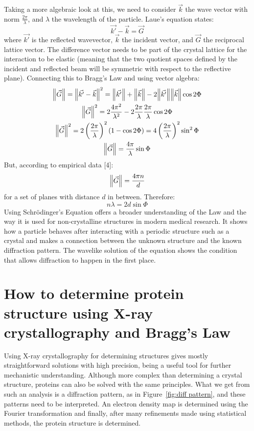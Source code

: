 Taking a more algebraic look at this, we need to consider $\vec{k}$ the wave
vector with norm $\frac{2\pi}{\lambda}$, and $\lambda$ the wavelength of the
particle.  Laue's equation states:
$$\vec{k'}-\vec{k}=\vec{G}$$
where $\vec{k'}$ is the reflected wavevector, $\vec{k}$ the incident vector,
and $\vec{G}$ the reciprocal lattice vector.  The difference vector needs to
be part of the crystal lattice for the interaction to be elastic (meaning that
the two quotient spaces defined by the incident and reflected beam will be
symmetric with respect to the reflective plane).  Connecting this to Bragg's
Law and using vector algebra:
\begin{gather*}
    \norm{\vec{G}}=\norm{\vec{k'}-\vec{k}}^2
      =\norm{\vec{k'}}+\norm{\vec{k}}-2\norm{\vec{k'}}\norm{\vec{k}}\cos{2\Phi} \\
    \norm{\vec{G}}^2=2\frac{4\pi^2}{\lambda^2}
      -2\frac{2\pi}{\lambda}\frac{2\pi}{\lambda}\cos{2\Phi}\\
    \norm{\vec{G}}^2=2\left(\frac{2\pi}{\lambda}\right)^2(1-\cos{2\Phi})
      =4\left(\frac{2\pi}{\lambda}\right)^2\sin^2{\Phi}\\
    \norm{\vec{G}}=\frac{4\pi}{\lambda}\sin{\Phi}
\end{gather*}
But, according to empirical data [4]:
$$\norm{\vec{G}}=\frac{4\pi n}{d}$$
for a set of planes with distance $d$ in between.  Therefore:
$$n\lambda=2d\sin{\Phi}$$
Using Schr\"{o}dinger's Equation offers a broader understanding of the Law and
the way it is used for non-crystalline structures in modern medical research.
It shows how a particle behaves after interacting with a periodic structure
such as a crystal and makes a connection between the unknown structure and the
known diffraction pattern.  The wavelike solution of the equation shows the
condition that allows diffraction to happen in the first place.

\section{How to determine protein structure using X-ray crystallography and
Bragg's Law}

Using X-ray crystallography for determining structures gives mostly
straightforward solutions with high precision, being a useful tool for further
mechanistic understanding.  Although more complex than determining a crystal
structure, proteins can also be solved with the same principles.  What we get
from such an analysis is a diffraction pattern, as in Figure~\ref{fig:diff
pattern}, and these patterns need to be interpreted.  An electron density map
is determined using the Fourier transformation and finally, after many
refinements made using statistical methods, the protein structure is
determined.

